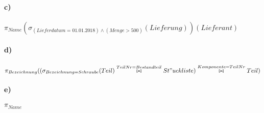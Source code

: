 \documentclass[12pt]{article}
\begin{document}
 	
 	\paragraph*{c)}
 	$\pi_{Name}(\sigma_{(Lieferdatum = 01.01.2018) \wedge (Menge > 500)}(Lieferung))(Lieferant)$
 	
 	
 	\paragraph*{d)}
 	$\pi_{Bezeichnung}(\large(\sigma_{Bezeichnung=Schraube}(Teil) \overset{TeilNr = Bestandteil}{\bowtie} St"uckliste\large) \overset{Komponente = TeilNr}{\bowtie} Teil)$
 	
 	\paragraph*{e)}
 	$\pi_{Name}$
 
\end{document}
